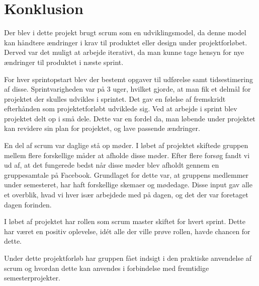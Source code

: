 \chapter{Konklusion}
Der blev i dette projekt brugt scrum som en udviklingsmodel, da denne model kan håndtere ændringer i krav til produktet eller design under projektforløbet. Derved var det muligt at arbejde iterativt, da man kunne tage hensyn for nye ændringer til produktet i næste sprint. \newline

 \noindent For hver sprintopstart blev der bestemt opgaver til udførelse samt tidsestimering af disse. Sprintvarigheden var på 3 uger, hvilket gjorde, at man fik et delmål for projektet der skulles udvikles i sprintet. Det gav en følelse af fremskridt efterhånden som projektetforløbt udviklede sig. Ved at arbejde i sprint blev projektet delt op i små dele. Dette var en fordel da, man løbende under projektet kan revidere sin plan for projektet, og lave passende ændringer. \newline 
 
 \noindent En del af scrum var daglige stå op møder. I løbet af projektet skiftede gruppen mellem flere forskellige måder at afholde disse møder. Efter flere forsøg fandt vi ud af, at det fungerede bedst når disse møder blev afholdt gennem en gruppesamtale på Facebook. Grundlaget for dette var, at gruppens medlemmer under semesteret, har haft forskellige skemaer og mødedage. Disse input gav alle et overblik, hvad vi hver især arbejdede med på dagen, og det der var foretaget dagen forinden. \newline
  
 \noindent I løbet af projektet har rollen som scrum master skiftet for hvert sprint. Dette har været en positiv oplevelse, idét alle der ville prøve rollen, havde chancen for dette. \newline
 
 \noindent Under dette projektforløb har gruppen fået indsigt i den praktiske anvendelse af scrum og hvordan dette kan anvendes i forbindelse med fremtidige semesterprojekter. 

 



 



